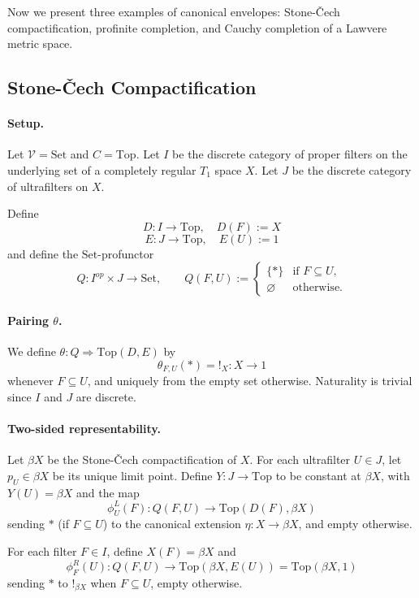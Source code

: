 \documentclass[11pt]{article}
\theoremstyle{plain}
\theoremstyle{definition}
\theoremstyle{remark}
\newcommand{\V}{\mathcal{V}}
\newcommand{\Top}{\mathrm{Top}}
\newcommand{\Set}{\mathrm{Set}}
\begin{document}
Now we present three examples of canonical envelopes: Stone-\v{C}ech compactification, profinite completion, and Cauchy completion of a Lawvere metric space.

\subsection{Stone-\v{C}ech Compactification}\label{ssec:stone-cech}

\paragraph{Setup.}
Let $\V=\Set$ and $C=\Top$. Let $I$ be the discrete category of proper filters
on the underlying set of a completely regular $T_1$ space $X$. Let $J$ be the
discrete category of ultrafilters on $X$.

Define
$$
D:I \longrightarrow \Top,\quad D(F) := X
$$
$$
E:J \longrightarrow \Top,\quad E(U) := 1
$$
and define the $\Set$-profunctor
$$
Q:I^{op} \times J \longrightarrow \Set,\qquad
Q(F,U) :=
\begin{cases}
\{\ast\} & \text{if $F \subseteq U$},\\
\varnothing & \text{otherwise}.
\end{cases}
$$

\paragraph{Pairing $\theta$.}
We define $\theta:Q \Rightarrow \Top(D,E)$ by
$$
\theta_{F,U}(\ast) = !_X : X \to 1
$$
whenever $F \subseteq U$, and uniquely from the empty set otherwise. Naturality
is trivial since $I$ and $J$ are discrete.

\paragraph{Two-sided representability.}
Let $\beta X$ be the Stone-\v{C}ech compactification of $X$. For each ultrafilter
$U \in J$, let $p_U \in \beta X$ be its unique limit point. Define $Y:J\to\Top$
to be constant at $\beta X$, with $Y(U) = \beta X$ and the map
$$
\phi^L_U(F) : Q(F,U) \to \Top(D(F),\beta X)
$$
sending $\ast$ (if $F\subseteq U$) to the canonical extension $\eta:X \to \beta X$,
and empty otherwise.

For each filter $F\in I$, define $X(F) = \beta X$ and
$$
\phi^R_F(U): Q(F,U) \to \Top(\beta X, E(U)) = \Top(\beta X, 1)
$$
sending $\ast$ to $!_{\beta X}$ when $F \subseteq U$, empty otherwise.
\end{document}
